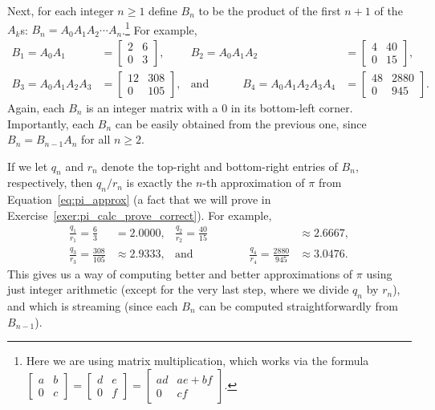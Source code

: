 Next, for each integer $n \geq 1$ define $B_n$ to be the product of the first $n+1$ of the $A_k$s: $B_n = A_0A_1A_2\cdots A_n$.\footnote{Here we are using matrix multiplication, which works via the formula $\begin{bmatrix}a & b \\ 0 & c\end{bmatrix} = \begin{bmatrix}d & e \\ 0 & f\end{bmatrix} = \begin{bmatrix}ad & ae+bf \\ 0 & cf\end{bmatrix}$.} For example,
\begin{align*}
	B_1 = A_0A_1 & = \begin{bmatrix}
		2 & 6 \\
		0 & 3
	\end{bmatrix}, & B_2 = A_0A_1A_2 & = \begin{bmatrix}
		4 & 40 \\
		0 & 15
	\end{bmatrix}, \\
	B_3 = A_0A_1A_2A_3 & = \begin{bmatrix}
		12 & 308 \\
		0 & 105
	\end{bmatrix}, & \text{and} \qquad\quad B_4 = A_0A_1A_2A_3A_4 & = \begin{bmatrix}
		48 & 2880 \\
		0 & 945
	\end{bmatrix}.
\end{align*}
Again, each $B_n$ is an integer matrix with a $0$ in its bottom-left corner. Importantly, each $B_n$ can be easily obtained from the previous one, since $B_n = B_{n-1}A_n$ for all $n \geq 2$.

If we let $q_n$ and $r_n$ denote the top-right and bottom-right entries of $B_n$, respectively, then $q_n / r_n$ is exactly the $n$-th approximation of $\pi$ from Equation~\eqref{eq:pi_approx} (a fact that we will prove in Exercise~\ref{exer:pi_calc_prove_correct}). For example,
\begin{align*}
	\frac{q_1}{r_1} = \frac{6}{3} & = 2.0000, & \frac{q_2}{r_2} = \frac{40}{15} & \approx 2.6667, \\
	\frac{q_3}{r_3} = \frac{308}{105} & \approx 2.9333, &  \text{and} \qquad\qquad\quad \frac{q_4}{r_4} = \frac{2880}{945} & \approx 3.0476.
\end{align*}
This gives us a way of computing better and better approximations of $\pi$ using just integer arithmetic (except for the very last step, where we divide $q_n$ by $r_n$), and which is streaming (since each $B_n$ can be computed straightforwardly from $B_{n-1}$).

